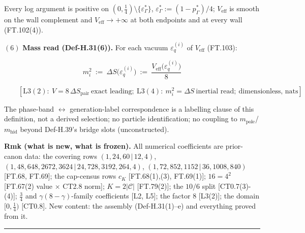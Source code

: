 \begin{definition}
Every log argument is positive on $(0,\tfrac14)\setminus\{\varepsilon^*_\Gamma\}$, $\varepsilon^*_\Gamma:=(1-p^*_\Gamma)/4$; $V_{\mathrm{eff}}$ is smooth on the wall complement and $V_{\mathrm{eff}}\to+\infty$ at both endpoints and at every wall (FT.102(4)).

$(6)$ \textbf{Mass read (Def-H.31(6)).} For each vacuum $\varepsilon_q^{(i)}$ of $V_{\mathrm{eff}}$ (FT.103):

\[
m_i^2\ :=\ \Delta S\bigl(\varepsilon_q^{(i)}\bigr)\ :=\ \frac{V_{\mathrm{eff}}\bigl(\varepsilon_q^{(i)}\bigr)}{8}
\]

\[
\qquad [\mathrm{L3}(2):\ V=8\,\Delta S_{\mathrm{pair}}\ \text{exact leading};\ \mathrm{L3}(4):\ m_i^2=\Delta S\ \text{inertial read};\ \text{dimensionless, nats}].
\]

The phase-band $\leftrightarrow$ generation-label correspondence is a labelling clause of this definition, not a derived selection; no particle identification; no coupling to $m_{\mathrm{pole}}$/$m_{\mathrm{hid}}$ beyond Def-H.39's bridge slots (unconstructed).

\textbf{Rmk (what is new, what is frozen).} All numerical coefficients are prior-canon data: the covering rows $(1,24,60\,|\,12,4)$, $(1,48,648,2672,3624\,|\,24,728,3192,264,4)$, $(1,72,852,1152\,|\,36,1008,840)$ [FT.68, FT.69]; the cap-census rows $c_K$ [FT.68(1),(3), FT.69(1)]; $16=4^2$ [FT.67(2) value $\times$ CT2.8 norm]; $K=2|\mathcal C|$ [FT.79(2)]; the $10/6$ split [CT0.7(3)-(4)]; $\tfrac34$ and $\gamma(8-\gamma)$-family coefficients [L2, L5]; the factor $8$ [L3(2)]; the domain $[0,\tfrac14)$ [CT0.8]. New content: the assembly (Def-H.31(1)–e) and everything proved from it.

\vspace{2pt}\noindent\rule{\textwidth}{0.4pt}\vspace{2pt}

\end{definition}

